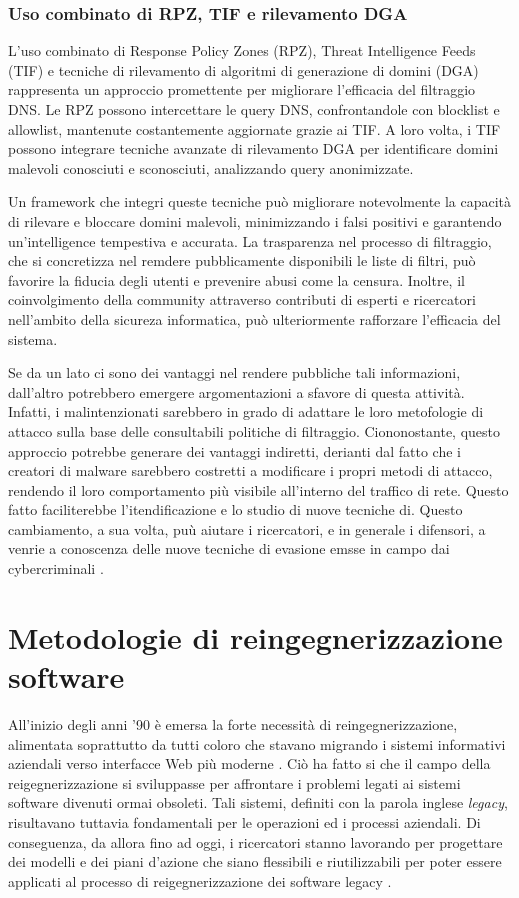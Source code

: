 \subsubsection{Uso combinato di RPZ, TIF e rilevamento DGA}
L'uso combinato di Response Policy Zones (RPZ), Threat Intelligence Feeds (TIF) e tecniche di rilevamento di algoritmi di generazione di domini (DGA) rappresenta un approccio promettente per migliorare l'efficacia del filtraggio DNS. Le RPZ possono intercettare le query DNS, confrontandole con blocklist e allowlist, mantenute costantemente aggiornate grazie ai TIF. A loro volta, i TIF possono integrare tecniche avanzate di rilevamento DGA per identificare domini malevoli conosciuti e sconosciuti, analizzando query anonimizzate.

Un framework che integri queste tecniche può migliorare notevolmente la capacità di rilevare e bloccare domini malevoli, minimizzando i falsi positivi e garantendo un'intelligence tempestiva e accurata. La trasparenza nel processo di filtraggio, che si concretizza nel remdere pubblicamente disponibili le liste di filtri, può favorire la fiducia degli utenti e prevenire abusi come la censura. Inoltre, il coinvolgimento della community attraverso contributi di esperti e ricercatori nell'ambito della sicureza informatica, può ulteriormente rafforzare l'efficacia del sistema.

Se da un lato ci sono dei vantaggi nel rendere pubbliche tali informazioni, dall'altro potrebbero emergere argomentazioni a sfavore di questa attività. Infatti, i malintenzionati sarebbero in grado di adattare le loro metofologie di attacco sulla base delle consultabili politiche di filtraggio. Ciononostante, questo approccio potrebbe generare dei vantaggi indiretti, derianti dal fatto che i creatori di malware sarebbero costretti a modificare i propri metodi di attacco, rendendo il loro comportamento più visibile all'interno del traffico di rete. Questo fatto faciliterebbe l'itendificazione e lo studio di nuove tecniche di. Questo cambiamento, a sua volta, puù aiutare i ricercatori, e in generale i difensori, a venrie a conoscenza delle nuove tecniche di evasione emsse in campo dai cybercriminali \cite{Magnusson2024}.

\section{Metodologie di reingegnerizzazione software}
All'inizio degli anni '90 è emersa la forte necessità di reingegnerizzazione, alimentata soprattutto da tutti coloro che stavano migrando i sistemi informativi aziendali verso interfacce Web più moderne \cite{Chikofsky1990}. Ciò ha fatto si che il campo della reigegnerizzazione si sviluppasse per affrontare i problemi legati ai sistemi software divenuti ormai obsoleti. Tali sistemi, definiti con la parola inglese \emph{legacy}, risultavano tuttavia fondamentali per le operazioni ed i processi aziendali. Di conseguenza, da allora fino ad oggi, i ricercatori stanno lavorando per progettare dei modelli e dei piani d'azione che siano flessibili e riutilizzabili per poter essere applicati al processo di reigegnerizzazione dei software legacy \cite{Majthoub2018}.

